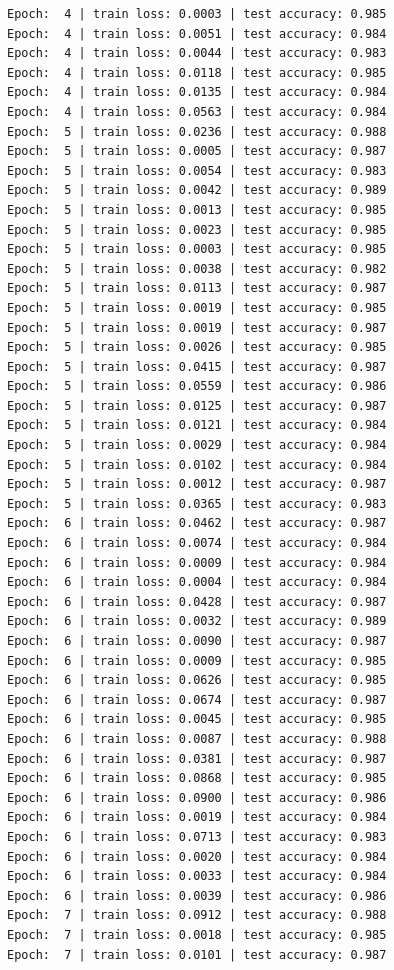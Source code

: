 \documentclass[11pt,UTF8]{ctexart}
\begin{document}
\begin{verbatim}
Epoch:  4 | train loss: 0.0003 | test accuracy: 0.985
Epoch:  4 | train loss: 0.0051 | test accuracy: 0.984
Epoch:  4 | train loss: 0.0044 | test accuracy: 0.983
Epoch:  4 | train loss: 0.0118 | test accuracy: 0.985
Epoch:  4 | train loss: 0.0135 | test accuracy: 0.984
Epoch:  4 | train loss: 0.0563 | test accuracy: 0.984
Epoch:  5 | train loss: 0.0236 | test accuracy: 0.988
Epoch:  5 | train loss: 0.0005 | test accuracy: 0.987
Epoch:  5 | train loss: 0.0054 | test accuracy: 0.983
Epoch:  5 | train loss: 0.0042 | test accuracy: 0.989
Epoch:  5 | train loss: 0.0013 | test accuracy: 0.985
Epoch:  5 | train loss: 0.0023 | test accuracy: 0.985
Epoch:  5 | train loss: 0.0003 | test accuracy: 0.985
Epoch:  5 | train loss: 0.0038 | test accuracy: 0.982
Epoch:  5 | train loss: 0.0113 | test accuracy: 0.987
Epoch:  5 | train loss: 0.0019 | test accuracy: 0.985
Epoch:  5 | train loss: 0.0019 | test accuracy: 0.987
Epoch:  5 | train loss: 0.0026 | test accuracy: 0.985
Epoch:  5 | train loss: 0.0415 | test accuracy: 0.987
Epoch:  5 | train loss: 0.0559 | test accuracy: 0.986
Epoch:  5 | train loss: 0.0125 | test accuracy: 0.987
Epoch:  5 | train loss: 0.0121 | test accuracy: 0.984
Epoch:  5 | train loss: 0.0029 | test accuracy: 0.984
Epoch:  5 | train loss: 0.0102 | test accuracy: 0.984
Epoch:  5 | train loss: 0.0012 | test accuracy: 0.987
Epoch:  5 | train loss: 0.0365 | test accuracy: 0.983
Epoch:  6 | train loss: 0.0462 | test accuracy: 0.987
Epoch:  6 | train loss: 0.0074 | test accuracy: 0.984
Epoch:  6 | train loss: 0.0009 | test accuracy: 0.984
Epoch:  6 | train loss: 0.0004 | test accuracy: 0.984
Epoch:  6 | train loss: 0.0428 | test accuracy: 0.987
Epoch:  6 | train loss: 0.0032 | test accuracy: 0.989
Epoch:  6 | train loss: 0.0090 | test accuracy: 0.987
Epoch:  6 | train loss: 0.0009 | test accuracy: 0.985
Epoch:  6 | train loss: 0.0626 | test accuracy: 0.985
Epoch:  6 | train loss: 0.0674 | test accuracy: 0.987
Epoch:  6 | train loss: 0.0045 | test accuracy: 0.985
Epoch:  6 | train loss: 0.0087 | test accuracy: 0.988
Epoch:  6 | train loss: 0.0381 | test accuracy: 0.987
Epoch:  6 | train loss: 0.0868 | test accuracy: 0.985
Epoch:  6 | train loss: 0.0900 | test accuracy: 0.986
Epoch:  6 | train loss: 0.0019 | test accuracy: 0.984
Epoch:  6 | train loss: 0.0713 | test accuracy: 0.983
Epoch:  6 | train loss: 0.0020 | test accuracy: 0.984
Epoch:  6 | train loss: 0.0033 | test accuracy: 0.984
Epoch:  6 | train loss: 0.0039 | test accuracy: 0.986
Epoch:  7 | train loss: 0.0912 | test accuracy: 0.988
Epoch:  7 | train loss: 0.0018 | test accuracy: 0.985
Epoch:  7 | train loss: 0.0101 | test accuracy: 0.987

\end{verbatim}
\end{document}
